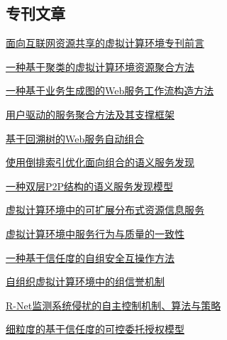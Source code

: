 \documentclass[a4paper]{article}
\begin{document}
\subsection{专刊文章}
\href{http://www.jos.org.cn/ch/reader/download_pdf.aspx?file_no=20070801&year_id=2007&quarter_id=8&falg=1}{面向互联网资源共享的虚拟计算环境专刊前言}

\href{http://www.jos.org.cn/ch/reader/download_pdf.aspx?file_no=20070802&year_id=2007&quarter_id=8&falg=1}{一种基于聚类的虚拟计算环境资源聚合方法}

\href{http://www.jos.org.cn/ch/reader/download_pdf.aspx?file_no=20070803&year_id=2007&quarter_id=8&falg=1}{一种基于业务生成图的Web服务工作流构造方法}

\href{http://www.jos.org.cn/ch/reader/download_pdf.aspx?file_no=20070804&year_id=2007&quarter_id=8&falg=1}{用户驱动的服务聚合方法及其支撑框架}

\href{http://www.jos.org.cn/ch/reader/download_pdf.aspx?file_no=20070805&year_id=2007&quarter_id=8&falg=1}{基于回溯树的Web服务自动组合}

\href{http://www.jos.org.cn/ch/reader/download_pdf.aspx?file_no=20070806&year_id=2007&quarter_id=8&falg=1}{使用倒排索引优化面向组合的语义服务发现}

\href{http://www.jos.org.cn/ch/reader/download_pdf.aspx?file_no=20070807&year_id=2007&quarter_id=8&falg=1}{一种双层P2P结构的语义服务发现模型}

\href{http://www.jos.org.cn/ch/reader/download_pdf.aspx?file_no=20070808&year_id=2007&quarter_id=8&falg=1}{虚拟计算环境中的可扩展分布式资源信息服务}

\href{http://www.jos.org.cn/ch/reader/download_pdf.aspx?file_no=20070809&year_id=2007&quarter_id=8&falg=1}{虚拟计算环境中服务行为与质量的一致性}

\href{http://www.jos.org.cn/ch/reader/download_pdf.aspx?file_no=20070810&year_id=2007&quarter_id=8&falg=1}{一种基于信任度的自组安全互操作方法}

\href{http://www.jos.org.cn/ch/reader/download_pdf.aspx?file_no=20070811&year_id=2007&quarter_id=8&falg=1}{自组织虚拟计算环境中的组信誉机制}

\href{http://www.jos.org.cn/ch/reader/download_pdf.aspx?file_no=20070812&year_id=2007&quarter_id=8&falg=1}{R-Net监测系统侵扰的自主控制机制、算法与策略}

\href{http://www.jos.org.cn/ch/reader/download_pdf.aspx?file_no=20070813&year_id=2007&quarter_id=8&falg=1}{细粒度的基于信任度的可控委托授权模型}
\end{document}
